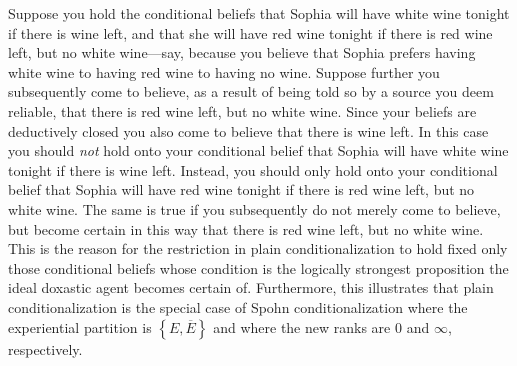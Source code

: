 Suppose you hold the conditional beliefs that Sophia will have white wine tonight if there is wine left, and that she will have red wine tonight if there is red wine left, but no white wine---say, because you believe that Sophia prefers having white wine to having red wine to having no wine. Suppose further you subsequently come to believe, as a result of being told so by a source you deem reliable, that there is red wine left, but no white wine. Since your beliefs are deductively closed you also come to believe that there is wine left. In this case you should \emph{not} hold onto your conditional belief that Sophia will have white wine tonight if there is wine left. Instead, you should only hold onto your conditional belief that Sophia will have red wine tonight if there is red wine left, but no white wine. The same is true if you subsequently do not merely come to believe, but become certain in this way that there is red wine left, but no white wine. This is the reason for the restriction in plain conditionalization to hold fixed only those conditional beliefs whose condition is the logically strongest proposition the ideal doxastic agent becomes certain of. Furthermore, this illustrates that plain conditionalization is the special case of Spohn conditionalization where the experiential partition is $\left\{E,\overline{E}\right\}$ and where the new ranks are $0$ and $\infty$, respectively.

